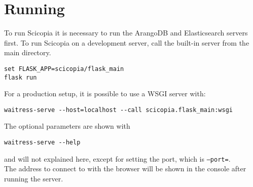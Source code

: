 \section{Running}
To run Scicopia it is necessary to run the ArangoDB and Elasticsearch servers first.
To run Scicopia on a development server, call the built-in server from the main directory.
\begin{verbatim}
set FLASK_APP=scicopia/flask_main
flask run
\end{verbatim}
For a production setup, it is possible to use a WSGI server with:
\begin{verbatim}
waitress-serve --host=localhost --call scicopia.flask_main:wsgi
\end{verbatim}
The optional parameters are shown with
\begin{verbatim}
waitress-serve --help
\end{verbatim}
and will not explained here, except for setting the port, which is \texttt{--port=}.\\
The address to connect to with the browser will be shown in the console after running the server.